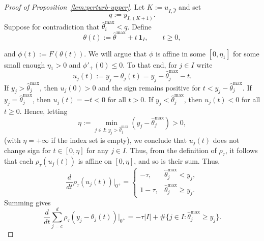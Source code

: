 \documentclass[10pt,a4paper]{amsart}
\newcommand{\one}{\mathbf 1}
\begin{document}
\begin{proof}[Proof of Proposition~\ref{lem:perturb-upper}]
Let $K:=u_{I,\hat J}$ and set
\[
q:=y_{I,(K+1)}.
\]
Suppose for contradiction that $\hat\theta_i^{\max}<q$.
Define
\begin{equation}\label{defn:theta_t}
    \theta(t):=\hat\theta^{\max}+t\,\one_I,\qquad t\ge 0,
\end{equation}

and $\phi(t):=F(\theta(t))$. We will argue that $\phi$ is affine in some $[0,\eta_1]$ for some small enough $\eta_1>0$ and $\phi'_{+}(0)\leq 0$. To that end, for $j\in I$ write
\[
u_j(t):=y_j-\theta_j(t)=y_j-\hat\theta^{\max}_j-t.
\]
If $y_j>\hat\theta^{\max}_j$, then $u_j(0)>0$ and the sign remains positive for
$t<y_j-\hat\theta^{\max}_j$.
If $y_j=\hat\theta^{\max}_j$, then $u_j(t)=-t<0$ for all $t>0$.
If $y_j<\hat\theta^{\max}_j$, then $u_j(t)<0$ for all $t\ge 0$.
Hence, letting
\[
\eta:=\min_{j\in I:\,y_j>\hat\theta^{\max}_j}
(y_j-\hat\theta^{\max}_j)>0,
\]
(with $\eta=+\infty$ if the index set is empty), we conclude that $u_j(t)$ does not change sign for $t\in [0,\eta]$ for any $j \in I.$ Thus, from the definition of $\rho_{\tau}$, it follows that each $\rho_\tau(u_j(t))$ is affine on $[0,\eta]$,
and so is their sum. Thus,
\[
\frac{d}{dt}\rho_\tau(u_j(t))\Big|_{0^+}
=
\begin{cases}
-\tau, & \hat\theta^{\max}_j<y_j,\\
1-\tau, & \hat\theta^{\max}_j\ge y_j.
\end{cases}
\]
Summing gives
\[
\frac{d}{dt}\sum_{j=c}^d \rho_\tau(y_j-\theta_j(t))\Big|_{0^+}
=
-\tau|I|+\#\{j\in I:\hat\theta^{\max}_j\ge y_j\}.
\]


\end{proof}
\end{document}
